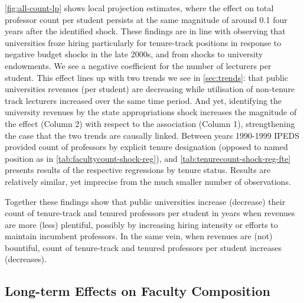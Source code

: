 \autoref{fig:all-count-lp} shows local projection estimates, where the effect on total professor count per student persists at the same magnitude of around 0.1 four years after the identified shock.
These findings are in line with \cite{turner2014impact} observing that universities froze hiring particularly for tenure-track positions in response to negative budget shocks in the late 2000s, and \cite{brown2014endowment} from shocks to university endowments.
We see a negative coefficient for the number of lecturers per student.
This effect lines up with two trends we see in \autoref{sec:trends}: that public universities revenues (per student) are decreasing while utilisation of non-tenure track lecturers increased over the same time period.
And yet, identifying the university revenues by the state appropriations shock increases the magnitude of the effect (Column 2) with respect to the association (Column 1), strengthening the case that the two trends are causally linked.
Between years 1990-1999 IPEDS provided count of professors by explicit tenure designation (opposed to named position as in \autoref{tab:facultycount-shock-reg}), and \autoref{tab:tenurecount-shock-reg-fte} presents results of the respective regressions by tenure status.
Results are relatively similar, yet imprecise from the much smaller number of observations.

Together these findings show that public universities increase (decrease) their count of tenure-track and tenured professors per student in years when revenues are more (less) plentiful, possibly by increasing hiring intensity or efforts to maintain incumbent professors.
In the same vein, when revenues are (not) bountiful, count of tenure-track and tenured professors per student increases (decreases).

\subsection{Long-term Effects on Faculty Composition}

